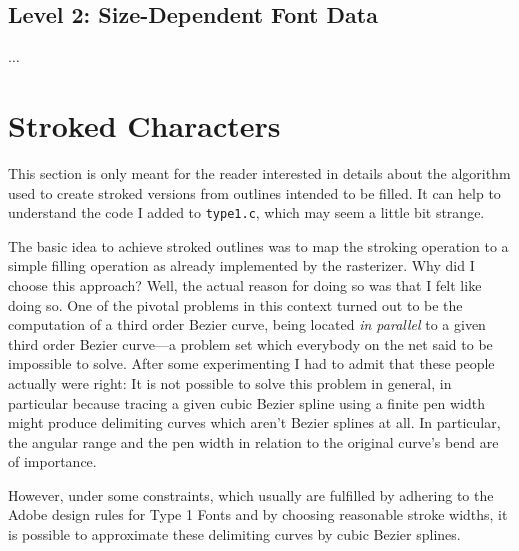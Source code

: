 \subsection{Level 2: Size-Dependent Font Data}
\label{sizedependentfontdata}%

$\ldots$

\newpage

\section{Stroked Characters}
\label{strokingimplementation}%
This section is only meant for the reader interested in details about the
algorithm used to create stroked versions from outlines intended to be
filled. It can help to understand the code I added to \verb+type1.c+, which
may seem a little bit strange.

The basic idea to achieve stroked outlines was to map the stroking operation
to a simple filling operation as already implemented by the rasterizer. Why
did I choose this approach? Well, the actual reason for doing so was that I
felt like doing so. One of the pivotal problems in this context turned out to
be the computation of a third order Bezier curve, being located {\em in
  parallel} to a given third order Bezier curve---a problem set which
everybody on the net said to be impossible to solve. After some experimenting
I had to admit that these people actually were right: It is not possible to
solve this problem in general, in particular because tracing a given cubic
Bezier spline using a finite pen width might produce delimiting curves which
aren't Bezier splines at all. In particular, the angular range and the pen
width in relation to the original curve's bend are of importance. 

However, under some constraints, which usually are fulfilled by adhering to
the Adobe design rules for Type 1 Fonts and by choosing reasonable stroke
widths, it is possible to approximate these delimiting curves by cubic Bezier
splines. 

